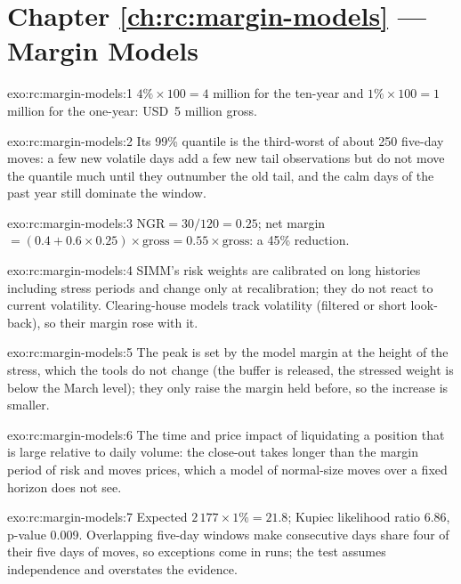 \section*{Chapter \ref{ch:rc:margin-models} --- Margin Models}

\begin{solution}{exo:rc:margin-models:1}
$4\%\times100 = 4$ million for the ten-year and $1\%\times100 = 1$ million for the one-year: USD~5 million gross.
\end{solution}

\begin{solution}{exo:rc:margin-models:2}
Its 99\% quantile is the third-worst of about 250 five-day moves: a few new volatile days add a few new
tail observations but do not move the quantile much until they outnumber the old tail, and the calm days
of the past year still dominate the window.
\end{solution}

\begin{solution}{exo:rc:margin-models:3}
$\mathrm{NGR} = 30/120 = 0.25$; net margin $= (0.4+0.6\times0.25)\times\text{gross} = 0.55\times\text{gross}$: a 45\% reduction.
\end{solution}

\begin{solution}{exo:rc:margin-models:4}
SIMM's risk weights are calibrated on long histories including stress periods and change only at
recalibration; they do not react to current volatility. Clearing-house models track volatility (filtered
or short look-back), so their margin rose with it.
\end{solution}

\begin{solution}{exo:rc:margin-models:5}
The peak is set by the model margin at the height of the stress, which the tools do not change (the
buffer is released, the stressed weight is below the March level); they only raise the margin held
before, so the increase is smaller.
\end{solution}

\begin{solution}{exo:rc:margin-models:6}
The time and price impact of liquidating a position that is large relative to daily volume: the close-out
takes longer than the margin period of risk and moves prices, which a model of normal-size moves over a
fixed horizon does not see.
\end{solution}

\begin{solution}{exo:rc:margin-models:7}
Expected $2\,177\times1\% = 21.8$; Kupiec likelihood ratio 6.86, p-value 0.009. Overlapping five-day windows make
consecutive days share four of their five days of moves, so exceptions come in runs; the test assumes
independence and overstates the evidence.
\end{solution}

